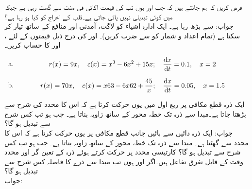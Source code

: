 فرض کریں کہ ہم جانتے ہیں کہ جب  اور  ہوں تب  کی قیمت  اکائی فی منٹ سے گھٹ رہی ہے جبکہ  میں کوئی تبدیلی نہیں پائی جاتی ہے۔قلب کے اخراج کو کیا ہو رہا ہے؟\\
جواب:\quad
{} سے بڑھ رہا ہے۔
\quad
ایک ادارہ  اشیاء کو  لاگت،  آمدنی اور  منافع کے ساتھ تیار کر سکتا ہے (تمام اعداد و شمار کو  سے ضرب کریں)۔ اور  کی درج ذیل قیمتوں کے لئے ،  اور  کا حساب کریں۔ 
\begin{enumerate}[a.]
\item
\begin{align*}
r(x)=9x,\quad c(x)=x^3-6x^2+15x;\quad  \frac{\dif x}{\dif t}=0.1,\quad x=2
\end{align*}
\item
\begin{align*}
r(x)=70x,\quad c(x)=x63-6x62+\frac{45}{x};\quad \frac{\dif x}{\dif t}=0.05,\quad x=1.5
\end{align*}
\end{enumerate} 
\quad
ایک ذرہ  قطع مکافی  پر ربع اول میں یوں حرکت کرتا ہے کہ اس کا  محدد  کی شرح سے بڑھتا جاتا ہے۔مبدا سے ذرہ تک خط،  محور کے ساتھ زاویہ  بناتا ہے۔ جب  ہو تب   کس شرح سے تبدیل ہو گا؟\\
جواب:\quad
{}
\quad
ایک ذرہ دائیں سے بائیں جانب قطع مکافی  پر یوں  حرکت کرتا ہے کہ اس کا  محدد  سے گھٹتا ہے۔ مبدا سے ذرہ تک خط،  محور کے ساتھ زاویہ  بناتا ہے۔ جب  ہو تب   کس شرح سے تبدیل ہو گا؟
\quad 
کارتیسی محدد پر حرکت کرتے ہوئے ذرہ کے  تعین گر  اور  محدد وقت  کے قابل تفرق تفاعل ہیں۔اگر  اور  ہوں تب مبدا سے ذرے کا فاصلہ کس شرح سے تبدیل ہو گا؟\\
جواب:\quad
{}
